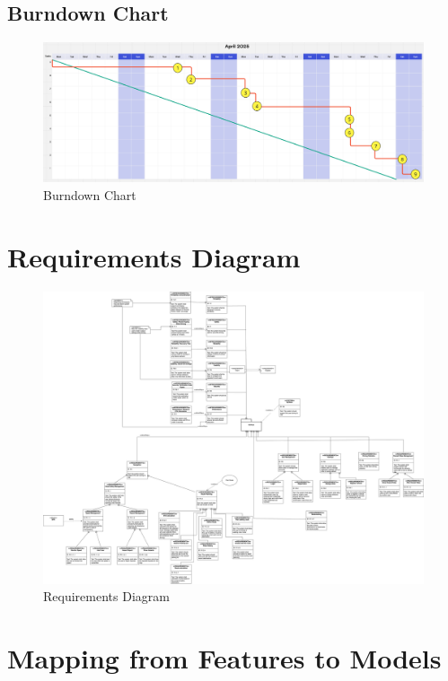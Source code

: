 \documentclass{article}
\begin{document}
\subsection*{Burndown Chart}

\begin{figure}[H]
  \centering
  \includegraphics[width=\textwidth]{images/burndown.png}
  \caption{Burndown Chart}
  \label{fig:burndown_chart}
\end{figure}

  
\clearpage
\section*{Requirements Diagram}
\begin{figure}[H]
    \centering
    \includegraphics[width=\textwidth]{images/SysML_Req.png}
    \caption{Requirements Diagram}
    \label{fig:requirements_diagram}
\end{figure}

  
\clearpage

\section*{Mapping from Features to Models}
\end{document}
